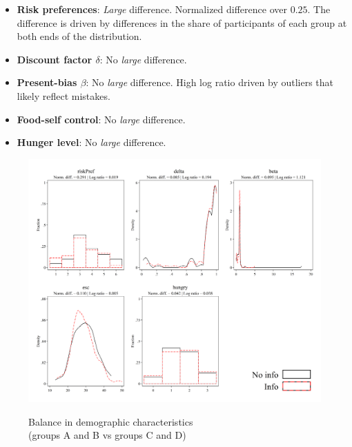 \documentclass[12pt]{article}
\begin{document}
\begin{itemize}
  \item \textbf{Risk preferences}: \emph{Large} difference.
  Normalized difference over $0.25$. The difference is driven by differences in the share of participants of each group at both ends of the distribution.

  \item \textbf{Discount factor $\delta$}: No \emph{large} difference.

  \item \textbf{Present-bias $\beta$}: No \emph{large} difference.
  High log ratio driven by outliers that likely reflect mistakes.

  \item \textbf{Food-self control}: No \emph{large} difference.

  \item \textbf{Hunger level}: No \emph{large} difference.
\end{itemize}

\begin{figure}[ht]
  \caption{Balance in demographic characteristics \\ (groups A and B vs groups C and D)}\label{fig:group1_attitudes}
  \begin{center}
  {\includegraphics[width=1\textwidth]{./figures/covDifExp_attitudes.png}}
  \end{center}
\end{figure}

\FloatBarrier
\end{document}
